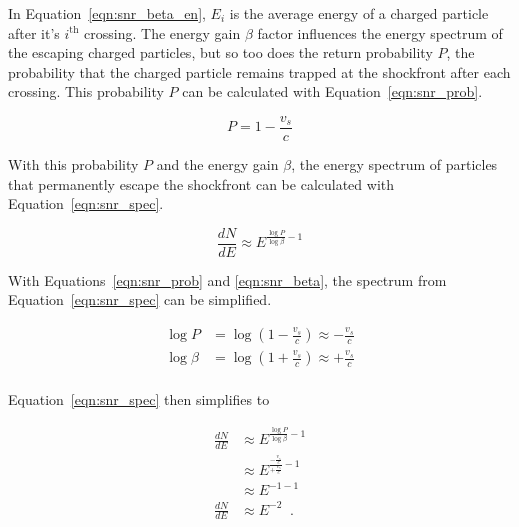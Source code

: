   In Equation~\ref{eqn:snr_beta_en}, $E_i$ is the average energy of a charged particle after it's $i^{\textrm{th}}$ crossing.
  The energy gain $\beta$ factor influences the energy spectrum of the escaping charged particles, but so too does the return probability $P$, the probability that the charged particle remains trapped at the shockfront after each crossing.
  This probability $P$ can be calculated with Equation~\ref{eqn:snr_prob}.
  
  \begin{equation}\label{eqn:snr_prob}
    P = 1 - \frac{v_s}{c}
  \end{equation}
  
  With this probability $P$ and the energy gain $\beta$, the energy spectrum of particles that permanently escape the shockfront can be calculated with Equation~\ref{eqn:snr_spec}.
  
  \begin{equation}\label{eqn:snr_spec}
    \frac{dN}{dE} \approx E^{ \frac{\log P}{\log \beta} - 1 }
  \end{equation}
  
  With Equations~\ref{eqn:snr_prob} and \ref{eqn:snr_beta}, the spectrum from Equation~\ref{eqn:snr_spec} can be simplified.

  \begin{equation}\label{eqn:snr_simplify}
    \begin{split}
       \log P     & = \log \left ( 1 - \frac{v_s}{c} \right ) \approx - \frac{v_s}{c} \\
       \log \beta & = \log \left ( 1 + \frac{v_s}{c} \right ) \approx + \frac{v_s}{c} \\
    \end{split}
  \end{equation}
  
  Equation~\ref{eqn:snr_spec} then simplifies to
  
  \begin{equation}\label{eqn:snr_spec_final}
    \begin{split}
      \frac{dN}{dE} & \approx E^{ \frac{\log P}{\log \beta} - 1 } \\
                    & \approx E^{ \frac{ -\frac{v_s}{c} }{ +\frac{v_s}{c} } - 1 } \\
                    & \approx E^{ -1 - 1 } \\
      \frac{dN}{dE} & \approx E^{ -2 } \;\; .
    \end{split}
  \end{equation}

